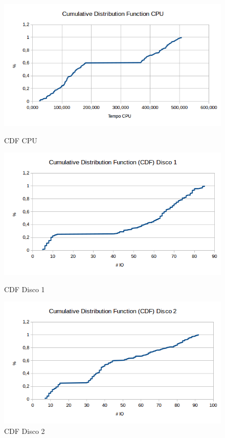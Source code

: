 \documentclass[11pt,a4paper,openany,oneside]{abntex2}
\begin{document}
\begin{figure}[H]
	\begin{minipage}[b]{0.45\linewidth}
		\centering
		\includegraphics[width=\textwidth]{cdfcpu.png}
		\caption{CDF CPU}
		\label{fig:cfdcpu}
	\end{minipage}
    \hspace{0.5cm}
	\begin{minipage}[b]{0.45\linewidth}
		\centering
		\includegraphics[width=\textwidth]{cdfdisco1.png}
		\caption{CDF Disco 1}
		\label{fig:cfdd1}
	\end{minipage}
	\hspace{0.5cm}
	\begin{minipage}[t]{0.45\linewidth}
		\centering
		\includegraphics[width=\textwidth]{cdfdisco2.png}
		\caption{CDF Disco 2}
		\label{fig:cfdd2}
	\end{minipage}
	
\end{figure}
\end{document}
